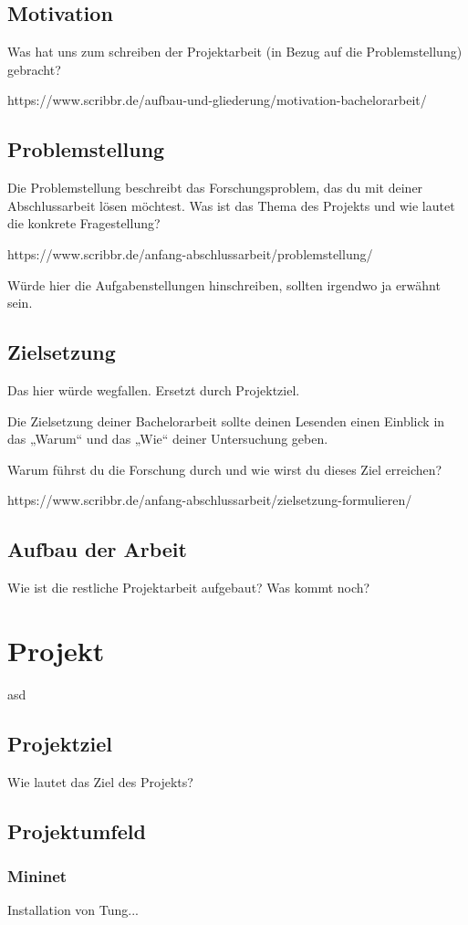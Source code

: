 \documentclass[fontsize=12pt,paper=a4,open=any,parskip=half,
  twoside=false,toc=listof,toc=bibliography,fleqn,leqno,
  captions=nooneline,captions=tableabove,british]{scrbook}
\begin{document}
\section{Motivation}
Was hat uns zum schreiben der Projektarbeit (in Bezug auf die Problemstellung) gebracht?

https://www.scribbr.de/aufbau-und-gliederung/motivation-bachelorarbeit/
\section{Problemstellung}
Die Problemstellung beschreibt das Forschungsproblem, das du mit deiner Abschlussarbeit lösen möchtest.
Was ist das Thema des Projekts und wie lautet die konkrete Fragestellung?

https://www.scribbr.de/anfang-abschlussarbeit/problemstellung/

Würde hier die Aufgabenstellungen hinschreiben, sollten irgendwo ja erwähnt sein.

\section{Zielsetzung}
Das hier würde wegfallen. Ersetzt durch Projektziel.

Die Zielsetzung deiner Bachelorarbeit sollte deinen Lesenden einen Einblick in das „Warum“ und das „Wie“ deiner Untersuchung geben.

Warum führst du die Forschung durch und wie wirst du dieses Ziel erreichen?

https://www.scribbr.de/anfang-abschlussarbeit/zielsetzung-formulieren/
\section{Aufbau der Arbeit}
Wie ist die restliche Projektarbeit aufgebaut? Was kommt noch?


\chapter{Projekt}
asd
\section{Projektziel}
Wie lautet das Ziel des Projekts?
\section{Projektumfeld}
\subsection{Mininet}
Installation von Tung...
\end{document}
